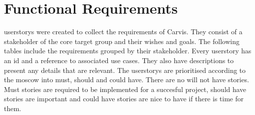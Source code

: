 \chapter{Functional Requirements}
\Glspl{userstory} were created to collect the requirements of Carvis. They consist of a \gls{stakeholder} of the core target group and their wishes and goals. The following tables include the requirements grouped by their \gls{stakeholder}. Every \gls{userstory} has an id and a reference to associated use cases. They also have descriptions to present any details that are relevant. The \glspl{userstory} are prioritised according to the \gls{moscow} into must, should and could have. There are no will not have stories. Must stories are required to be implemented for a succesful project, should have stories are important and could have stories are nice to have if there is time for them. 

